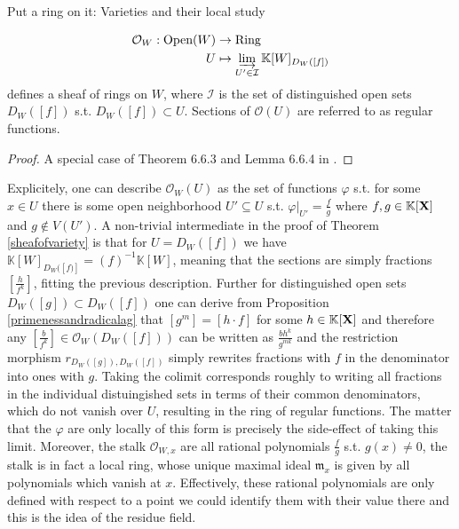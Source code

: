 \begin{subsection}{Put a ring on it: Varieties and their local study}
\begin{theorem}
\begin{align*}
            \mathcal{O}_W : \text{Open}(W) & \to \text{Ring} \\
            U & \mapsto \varinjlim_{U' \in \mathcal{I}} \mathbb{K}[W]_{D_W([f])}
        \end{align*}
        defines a sheaf of rings on \( W \), where \( \mathcal{I} \) is the set of distinguished open sets \( D_W([f]) \) s.t. \( D_W([f]) \subset U \). 
        Sections of \( \mathcal{O}(U) \) are referred to as regular functions. 
    \end{theorem}
    \begin{proof}
        A special case of Theorem 6.6.3 and Lemma 6.6.4 in \cite{alggeoandcom}.
    \end{proof}
    Explicitely, one can describe \( \mathcal{O}_W(U) \) as the set of functions \( \varphi \) s.t. for some \( x \in U \) there is some open neighborhood \( U' \subseteq U \)
    s.t. \( \varphi|_{U'} = \frac{f}{g} \) where \( f, g \in \mathbb{K}[\mathbf{X}] \) and \( g \notin V(U') \). 
    A non-trivial intermediate in the proof of Theorem \ref{sheafofvariety} is that for \( U = D_W([f]) \) we have \( \mathbb{K}[W]_{D_W([f)]} = (f)^{-1} \mathbb{K}[W] \),
    meaning that the sections are simply fractions \( \left[\frac{h}{f^k}\right] \), fitting the previous description.
    Further for distinguished open sets \( D_W([g]) \subset D_W([f]) \) one can derive from Proposition \ref{primenessandradicalag} 
    that \( [g^m] = [h \cdot f] \) for some \( h \in \mathbb{K}[\mathbf{X}] \) and therefore any \( \left[\frac{b}{f^k}\right] \in \mathcal{O}_W(D_W([f])) \) can be written as 
    \( \frac{b h^k}{g^{mk}} \) and the restriction morphism \( r_{D_W([g]),D_W([f])} \) simply rewrites fractions with \( f \) in the denominator into ones with \( g \).
    Taking the colimit corresponds roughly to writing all fractions in the individual distuingished sets in terms of their common denominators, which do not vanish over \( U \),
    resulting in the ring of regular functions. The matter that the \( \varphi \) are only locally of this form is precisely the side-effect of taking this limit.
    Moreover, the stalk \( \mathcal{O}_{W,x} \) are all rational polynomials \( \frac{f}{g} \) s.t. \( g(x) \neq 0 \), the stalk is in fact a local ring,
    whose unique maximal ideal \( \mathfrak{m}_x \) is given by all polynomials which vanish at \( x \).
    Effectively, these rational polynomials are only defined with respect to a point we could identify them with their value there and this 
    is the idea of the residue field.

\end{subsection}
